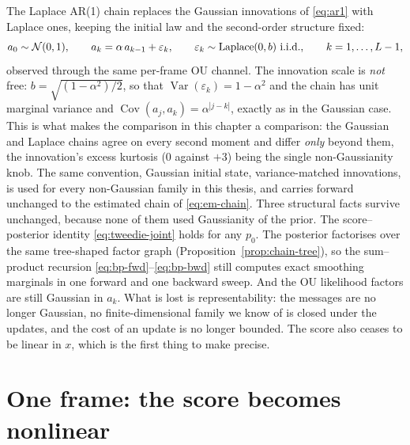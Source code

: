 The Laplace AR(1) chain replaces the Gaussian innovations of
\eqref{eq:ar1} with Laplace ones, keeping the initial law and the
second-order structure fixed:
\begin{equation}
  a_0 \sim \mathcal{N}(0,1), \qquad
  a_k = \alpha\, a_{k-1} + \varepsilon_k, \qquad
  \varepsilon_k \sim \mathrm{Laplace}(0, b) \ \text{i.i.d.}, \qquad
  k = 1,\dots,L-1 ,
  \label{eq:l-chain-prior}
\end{equation}
observed through the same per-frame OU channel. The innovation scale is
\emph{not} free: $b = \sqrt{(1-\alpha^2)/2}$, so that
$\operatorname{Var}(\varepsilon_k) = 1-\alpha^2$ and the chain has unit
marginal variance and $\operatorname{Cov}(a_j,a_k)=\alpha^{|j-k|}$, exactly
as in the Gaussian case. This is what makes the comparison in this chapter
a comparison: the Gaussian and Laplace chains agree on every second moment
and differ \emph{only} beyond them, the innovation's excess kurtosis
($0$ against $+3$) being the single non-Gaussianity knob. The same
convention, Gaussian initial state, variance-matched innovations, is
used for every non-Gaussian family in this thesis, and carries forward
unchanged to the estimated chain of \eqref{eq:em-chain}. Three structural facts
survive unchanged, because none of them used Gaussianity of the prior.
The score--posterior identity \eqref{eq:tweedie-joint} holds for any
$p_0$. The posterior factorises over the same tree-shaped factor graph
(Proposition~\ref{prop:chain-tree}), so the sum--product recursion
\eqref{eq:bp-fwd}--\eqref{eq:bp-bwd} still computes exact smoothing
marginals in one forward and one backward sweep. And the OU likelihood
factors are
still Gaussian in $a_k$. What is lost is representability: the messages
are no longer Gaussian, no finite-dimensional family we know of is closed
under the updates, and the cost of an update is no longer bounded. The
score also ceases to be linear in $x$, which is the first thing to make
precise.

\section{One frame: the score becomes nonlinear}\label{sec:l-K1}

